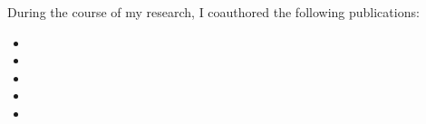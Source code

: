 \tableofcontents


% 


During the course of my research, I coauthored the following publications:

\nobibliography*
\begin{NoHyper}
\begin{itemize}
\item {}
\item {}
\item {}
\item {}
\item {}
\end{itemize}
\end{NoHyper}

\cleardoublepage
{}

